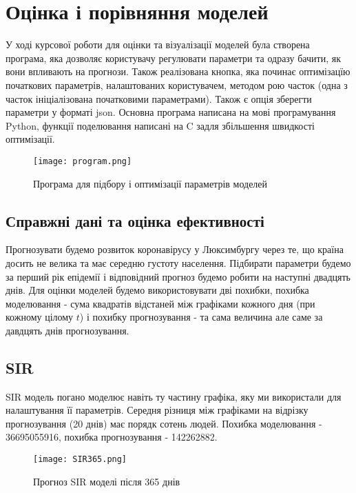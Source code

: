 \chapter{Оцінка і порівняння моделей}


У ході курсової роботи для оцінки та візуалізації моделей була створена 
програма, яка дозволяє користувачу регулювати параметри та одразу бачити, 
як вони впливають на прогнози. Також реалізована кнопка, яка починає 
оптимізацїю початкових параметрів, налаштованих користувачем, методом рою 
часток (одна з часток ініціалізована початковими параметрами). Також 
є опція зберегти параметри у форматі json. 
Основна програма написана на мові програмування Python, функції поделювання 
написані на C задля збільшення швидкості оптимізації.

\begin{figure}[H]
    \centering
    \texttt{[image: program.png]}
    \caption{Програма для підбору і оптимізації параметрів моделей}
    \label{fig:plot0}
\end{figure}


\section{Справжні дані та оцінка ефективності}

Прогнозувати будемо розвиток коронавірусу у Люксимбургу через те, що країна 
досить не велика та має середню густоту населення. 
Підбирати параметри будемо за перший рік епідемії і відповідний прогноз 
будемо робити на наступні двадцять днів. Для оцінки моделей будемо 
використовувати дві похибки, похибка моделювання - сума квадратів відстаней 
між графіками кожного дня (при кожному цілому $t$) і похибку прогнозування -
та сама величина але саме за давдцять днів прогнозування. 

\section{SIR}


SIR модель погано моделює навіть ту частину графіка, яку ми використали для 
налаштування її параметрів. Середня різниця між графіками на відрізку 
прогнозування (20 днів) має порядк сотень людей. 
Похибка моделювання - 36695055916, похибка прогнозування - 142262882.


\begin{figure}[H]
    \centering
    \texttt{[image: SIR365.png]}
    \caption{Прогноз SIR моделі після 365 днів}
    \label{fig:plot1}
\end{figure}


